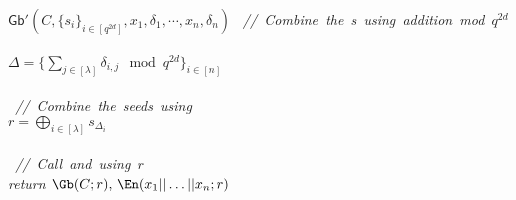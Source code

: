 \documentclass{article}
\newcommand{\comment}[1]{\sl\small\color{black!50} \mbox{ // #1 }}
\begin{document}
\begin{codebox}{$\mathsf{Gb}'(C, \{s_i\}_{i \in [q^{2d}]}, x_1, \delta_1, \cdots, x_n, \delta_n)$}
    \comment{Combine the \delta{}s using addition mod $q^{2d}$}\\
    $\Delta = \{ \sum_{j \in [\lambda]}  \delta_{i,j} \mod q^{2d}\}_{i \in [n]}$\\
    \\
    \comment{Combine the seeds using \Delta}\\
    $r = \bigoplus_{i \in [\lambda]} s_{\Delta_i}$\\
    \\
    \comment{Call \Gb and \En using $r$}\\
    return $\Gb(C; r),\, \En(x_1 || \dots || x_n; r)$
\end{codebox}
\end{document}
